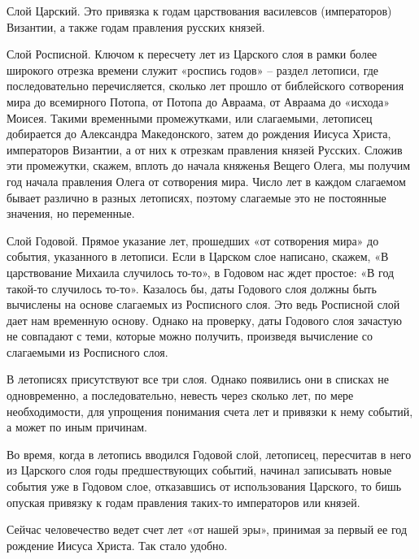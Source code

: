 Слой Царский. Это привязка к годам царствования василевсов (императоров) Византии, а также годам правления русских князей.

Слой Росписной. Ключом к пересчету лет из Царского слоя в рамки более широкого отрезка времени служит «роспись годов» – раздел летописи, где последовательно перечисляется, сколько лет прошло от библейского сотворения мира до всемирного Потопа, от Потопа до Авраама, от Авраама до «исхода» Моисея. Такими временными промежутками, или слагаемыми, летописец добирается до Александра Македонского, затем до рождения Иисуса Христа, императоров Византии, а от них к отрезкам правления князей Русских. Сложив эти промежутки, скажем, вплоть до начала княженья Вещего Олега, мы получим год начала правления Олега от сотворения мира. Число лет в каждом слагаемом бывает различно в разных летописях, поэтому слагаемые это не постоянные значения, но переменные.

Слой Годовой. Прямое указание лет, прошедших «от сотворения мира» до события, указанного в летописи. Если в Царском слое написано, скажем, «В царствование Михаила случилось то-то», в Годовом нас ждет простое: «В год такой-то случилось то-то». Казалось бы, даты Годового слоя должны быть вычислены на основе слагаемых из Росписного слоя. Это ведь Росписной слой дает нам временную основу. Однако на проверку, даты Годового слоя зачастую не совпадают с теми, которые можно получить, произведя вычисление со слагаемыми из Росписного слоя.

В летописях присутствуют все три слоя. Однако появились они в списках не одновременно, а последовательно, невесть через сколько лет, по мере необходимости, для упрощения понимания счета лет и привязки к нему событий, а может по иным причинам.

Во время, когда в летопись вводился Годовой слой, летописец, пересчитав в него из Царского слоя годы предшествующих событий, начинал записывать новые события уже в Годовом слое, отказавшись от использования Царского, то бишь опуская привязку к годам правления таких-то императоров или князей.

Сейчас человечество ведет счет лет «от нашей эры», принимая за первый ее год рождение Иисуса Христа. Так стало удобно.

